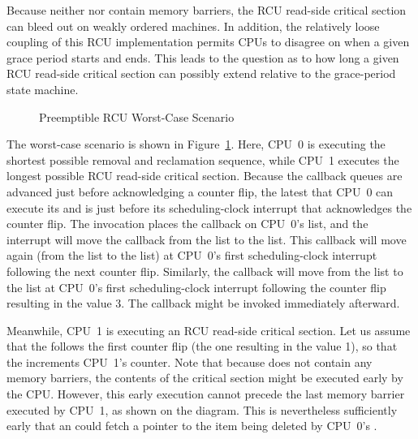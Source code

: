 Because neither  nor 
contain memory barriers, the RCU read-side critical section can bleed
out on weakly ordered machines.
In addition, the relatively loose coupling of this RCU implementation
permits CPUs to disagree on when a given grace period starts and ends.
This leads to the question as to how long a given RCU read-side critical
section can possibly extend relative to the grace-period state machine.

\begin{figure}[htb]
\centering
{}
\caption{Preemptible RCU Worst-Case Scenario}
\label{app:rcuimpl:Preemptible RCU Worst-Case Scenario}
\end{figure}

The worst-case scenario is shown in
Figure~\ref{app:rcuimpl:Preemptible RCU Worst-Case Scenario}.
Here, CPU~0 is executing the shortest possible
removal and reclamation sequence,
while CPU~1 executes the longest possible RCU read-side critical
section.
Because the callback queues are advanced just before acknowledging a
counter flip, the latest that CPU~0 can execute its
 and  is just before
its scheduling-clock interrupt that acknowledges the counter flip.
The  invocation places the callback on CPU~0's
 list, and the interrupt will move the callback from
the  list to the  list.
This callback will move again (from the  list
to the  list) at CPU~0's first scheduling-clock
interrupt following the next counter flip.
Similarly, the callback will move from the  list
to the  list at CPU~0's first scheduling-clock
interrupt following the counter flip resulting in the value 3.
The callback might be invoked immediately afterward.

Meanwhile, CPU~1 is executing an RCU read-side critical section.
Let us assume that the  follows the first
counter flip (the one resulting in the value 1), so that the
 increments CPU~1's
 counter.
Note that because  does not contain any
memory barriers, the contents of the critical section might be executed
early by the CPU.
However, this early execution cannot precede the last memory barrier
executed by CPU~1, as shown on the diagram.
This is nevertheless sufficiently early that an 
could fetch a pointer to the item being deleted by CPU~0's
.

